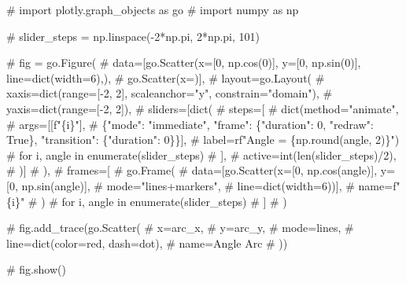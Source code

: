 \documentclass[
  letterpaper,
  DIV=11,
  numbers=noendperiod]{scrartcl}
\newenvironment{Shaded}{\begin{snugshade}}{\end{snugshade}}
\newcommand{\CommentTok}[1]{\textcolor[rgb]{0.37,0.37,0.37}{#1}}
\begin{document}
\begin{Shaded}
\begin{Highlighting}[]
\CommentTok{\# import plotly.graph\_objects as go}
\CommentTok{\# import numpy as np}

\CommentTok{\# slider\_steps = np.linspace({-}2*np.pi, 2*np.pi, 101)}

\CommentTok{\# fig = go.Figure(}
\CommentTok{\#     data=[go.Scatter(x=[0, np.cos(0)], y=[0, np.sin(0)], line=dict(width=6),),}
\CommentTok{\#           go.Scatter(x=)],}
\CommentTok{\#     layout=go.Layout(}
\CommentTok{\#         xaxis=dict(range=[{-}2, 2], scaleanchor="y", constrain="domain"),}
\CommentTok{\#         yaxis=dict(range=[{-}2, 2]),}
\CommentTok{\#         sliders=[dict(}
\CommentTok{\#             steps=[}
\CommentTok{\#                 dict(method="animate",}
\CommentTok{\#                      args=[[f"\{i\}"],}
\CommentTok{\#                            \{"mode": "immediate", "frame": \{"duration": 0, "redraw": True\}, "transition": \{"duration": 0\}\}],}
\CommentTok{\#                      label=rf"Angle = \{np.round(angle, 2)\}")}
\CommentTok{\#                 for i, angle in enumerate(slider\_steps)}
\CommentTok{\#             ],}
\CommentTok{\#             active=int(len(slider\_steps)/2),}
\CommentTok{\#         )]}
\CommentTok{\#     ),}
\CommentTok{\#     frames=[}
\CommentTok{\#         go.Frame(}
\CommentTok{\#             data=[go.Scatter(x=[0, np.cos(angle)], y=[0, np.sin(angle)],}
\CommentTok{\#                              mode="lines+markers",}
\CommentTok{\#                              line=dict(width=6))],}
\CommentTok{\#             name=f"\{i\}"}
\CommentTok{\#         )}
\CommentTok{\#         for i, angle in enumerate(slider\_steps)}
\CommentTok{\#     ]}
\CommentTok{\# )}

\CommentTok{\# fig.add\_trace(go.Scatter(}
\CommentTok{\#     x=arc\_x,}
\CommentTok{\#     y=arc\_y,}
\CommentTok{\#     mode=\textquotesingle{}lines\textquotesingle{},}
\CommentTok{\#     line=dict(color=\textquotesingle{}red\textquotesingle{}, dash=\textquotesingle{}dot\textquotesingle{}),}
\CommentTok{\#     name=\textquotesingle{}Angle Arc\textquotesingle{}}
\CommentTok{\# ))}

\CommentTok{\# fig.show()}
\end{Highlighting}
\end{Shaded}
\end{document}
